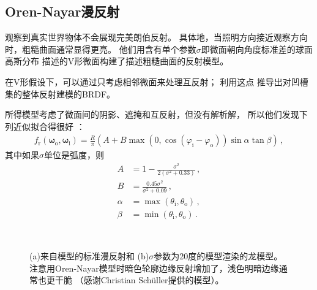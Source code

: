 \subsection{Oren-Nayar漫反射}\label{sub:Oren-Nayar漫反射}
\citet{10.1145/192161.192213}观察到真实世界物体不会展现完美朗伯反射。
具体地，当照明方向接近观察方向时，粗糙曲面通常显得更亮。
他们用含有单个参数$\sigma$即微面朝向角度标准差的球面高斯分布
描述的V形微面构建了描述粗糙曲面的反射模型。

在V形假设下，可以通过只考虑相邻微面来处理互反射；
\citeauthor{10.1145/192161.192213}利用这点
推导出对凹槽集的整体反射建模的BRDF。

所得模型考虑了微面间的阴影、遮掩和互反射，但没有解析解，
所以他们发现下列近似拟合得很好
：
\begin{align*}
    f_{\mathrm{r}}({\bm\omega}_{\mathrm{o}},{\bm\omega}_{\mathrm{i}})=\frac{R}{\pi}(A+B\max(0,\cos(\varphi_{\mathrm{i}}-\varphi_{\mathrm{o}}))\sin\alpha\tan\beta)\, ,
\end{align*}
其中如果$\sigma$单位是弧度，则
\begin{align*}
    A      & =1-\frac{\sigma^2}{2(\sigma^2+0.33)}\, ,           \\
    B      & =\frac{0.45\sigma^2}{\sigma^2+0.09}\, ,            \\
    \alpha & =\max(\theta_{\mathrm{i}},\theta_{\mathrm{o}})\, , \\
    \beta  & =\min(\theta_{\mathrm{i}},\theta_{\mathrm{o}})\, .
\end{align*}

\begin{figure}[htbp]
    \centering
    \\
    \caption{(a)来自模型的标准漫反射和
        (b)$\sigma$参数为20度的模型渲染的龙模型。
        注意用Oren-Nayar模型时暗色轮廓边缘反射增加了，浅色明暗边缘通常也更干脆
        （感谢Christian Schüller提供的模型）。}
    \label{fig:8.14}
\end{figure}


